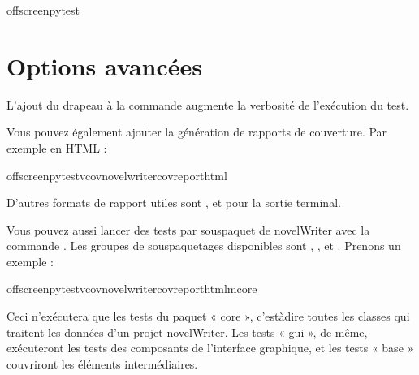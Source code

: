 \documentclass[a4paper,11pt,french]{sphinxmanual}
\begin{document}
\begin{sphinxVerbatim}[commandchars=\\\{\}]
offscreenpytest
\end{sphinxVerbatim}


\section{Options avancées}
\label{\detokenize{tech_tests:advanced-options}}
\sphinxAtStartPar
L’ajout du drapeau  à la commande  augmente la verbosité de l’exécution du test.

\sphinxAtStartPar
Vous pouvez également ajouter la génération de rapports de couverture. Par exemple en HTML :

\begin{sphinxVerbatim}[commandchars=\\\{\}]
offscreenpytest\PYGZhy{}v\PYGZhy{}\PYGZhy{}covnovelwriter\PYGZhy{}\PYGZhy{}cov\PYGZhy{}reporthtml
\end{sphinxVerbatim}

\sphinxAtStartPar
D’autres formats de rapport utiles sont , et  pour la sortie terminal.

\sphinxAtStartPar
Vous pouvez aussi lancer des tests par sous\sphinxhyphen{}paquet de novelWriter avec la commande . Les groupes de sous\sphinxhyphen{}paquetages disponibles sont , , et . Prenons un exemple :

\begin{sphinxVerbatim}[commandchars=\\\{\}]
offscreenpytest\PYGZhy{}v\PYGZhy{}\PYGZhy{}covnovelwriter\PYGZhy{}\PYGZhy{}cov\PYGZhy{}reporthtml\PYGZhy{}mcore
\end{sphinxVerbatim}

\sphinxAtStartPar
Ceci n’exécutera que les tests du paquet « core », c’est\sphinxhyphen{}à\sphinxhyphen{}dire toutes les classes qui traitent les données d’un projet novelWriter. Les tests « gui », de même, exécuteront les tests des composants de l’interface graphique, et les tests « base » couvriront les éléments intermédiaires.
\end{document}
